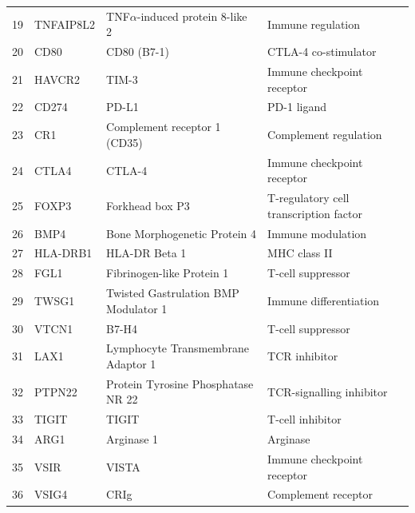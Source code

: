 \begin{table}[htbp]
\begin{tabular}{clll}
    19 & TNFAIP8L2 & TNF$\alpha$-induced protein 8-like 2      & Immune regulation \\
    20 & CD80      & CD80 (B7-1)                               & CTLA-4 co-stimulator \\
    21 & HAVCR2    & TIM-3                                     & Immune checkpoint receptor \\
    22 & CD274     & PD-L1                                     & PD-1 ligand \\
    23 & CR1       & Complement receptor 1 (CD35)              & Complement regulation \\
    24 & CTLA4     & CTLA-4                                    & Immune checkpoint receptor \\
    25 & FOXP3     & Forkhead box P3                           & T-regulatory cell transcription factor \\
    26 & BMP4      & Bone Morphogenetic Protein 4              & Immune modulation \\
    27 & HLA-DRB1  & HLA-DR Beta 1                             & MHC class II \\
    28 & FGL1      & Fibrinogen-like Protein 1                 & T-cell suppressor \\
    29 & TWSG1     & Twisted Gastrulation BMP Modulator 1      & Immune differentiation \\
    30 & VTCN1     & B7-H4                                     & T-cell suppressor \\
    31 & LAX1      & Lymphocyte Transmembrane Adaptor 1        & TCR inhibitor \\
    32 & PTPN22    & Protein Tyrosine Phosphatase NR 22        & TCR-signalling inhibitor \\
    33 & TIGIT     & TIGIT                                     & T-cell inhibitor \\
    34 & ARG1      & Arginase 1                                & Arginase \\
    35 & VSIR      & VISTA                                     & Immune checkpoint receptor \\
    36 & VSIG4     & CRIg                                      & Complement receptor \\
    \hline
  \end{tabular}
\end{table}

